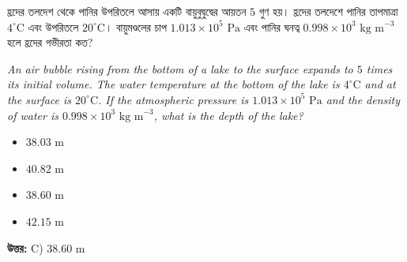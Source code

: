 \documentclass[12pt, a4paper]{article}
\begin{document}
\newpage
\begin{tcolorbox}[questionbox={প্রশ্ন (Question) 1}]
    \noindent
    হ্রদের তলদেশ থেকে পানির উপরিতলে আসায় একটি বায়ুবুদ্বুদ্বের আয়তন $5$ গুণ হয়। হ্রদের তলদেশে পানির তাপমাত্রা $4^\circ\text{C}$ এবং উপরিতলে $20^\circ\text{C}$। বায়ুমণ্ডলের চাপ $1.013 \times 10^5\text{ Pa}$ এবং পানির ঘনত্ব $0.998 \times 10^3\text{ kg m}^{-3}$ হলে হ্রদের গভীরতা কত?
    
    \vspace{0.8em}
    \begin{english}
    \noindent\textit{\color{darkgray}
    An air bubble rising from the bottom of a lake to the surface expands to $5$ times its initial volume. The water temperature at the bottom of the lake is $4^\circ\text{C}$ and at the surface is $20^\circ\text{C}$. If the atmospheric pressure is $1.013 \times 10^5\text{ Pa}$ and the density of water is $0.998 \times 10^3\text{ kg m}^{-3}$, what is the depth of the lake?
    }
    \end{english}
\end{tcolorbox}

\begin{itemize}[label={}, leftmargin=1cm, itemsep=0.5em]
    \item[\textbf{A)}] $38.03\text{ m}$
    \item[\textbf{B)}] $40.82\text{ m}$
    \item[\textbf{C)}] $38.60\text{ m}$
    \item[\textbf{D)}] $42.15\text{ m}$
\end{itemize}

\vspace{0.5em}
\begin{tcolorbox}[answerbox]
    \textbf{\color{success} উত্তর:} C) $38.60\text{ m}$
\end{tcolorbox}
\vspace{1em}
\end{document}
